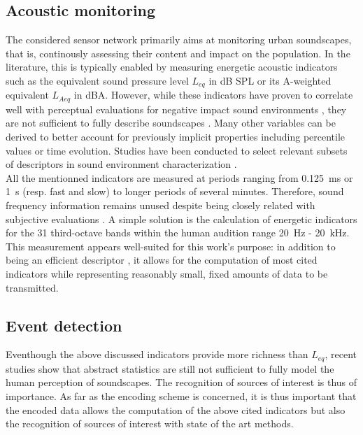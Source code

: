 \documentclass[final,3p,times,twocolumn]{elsarticle}
\begin{document}
\subsection{Acoustic monitoring}

The considered sensor network primarily aims at monitoring urban soundscapes, that is, continously assessing their content and impact on the population. In the literature, this is typically enabled by measuring energetic acoustic indicators such as the equivalent sound pressure level $L_{eq}$ in dB SPL or its A-weighted equivalent $L_{Aeq}$ in dBA. However, while these indicators have proven to correlate well with perceptual evaluations for negative impact sound environments \cite{gozalo2015}, they are not sufficient to fully describe soundscapes \cite{rychtarikova2013}. Many other variables can be derived to better account for previously implicit properties \cite{can2016} including percentile values or time evolution. Studies have been conducted to select relevant subsets of descriptors in sound environment characterization \cite{can2015, brocolini2013, nilsson2007}.\\

All the mentionned indicators are measured at periods ranging from 0.125~ms or 1~s (resp. fast and slow) to longer periods of several minutes. Therefore, sound frequency information remains unused despite being closely related with subjective evaluations \cite{ishiyama2000}. A simple solution is the calculation of energetic indicators for the 31 third-octave bands within the human audition range 20~Hz - 20~kHz.\\

This measurement appears well-suited for this work's purpose: in addition to being an efficient descriptor \cite{torija2013}, it allows for the computation of most cited indicators while representing reasonably small, fixed amounts of data to be transmitted.

\subsection{Event detection}

Eventhough the above discussed indicators provide more richness than $L_{eq}$, recent studies show that abstract statistics are still not sufficient to fully model the human perception of soundscapes. The recognition of sources of interest is thus of importance. As far as the encoding scheme is concerned, it is thus important that the encoded data allows the computation of the above cited indicators but also the recognition of sources of interest with state of the art methods.
\end{document}
